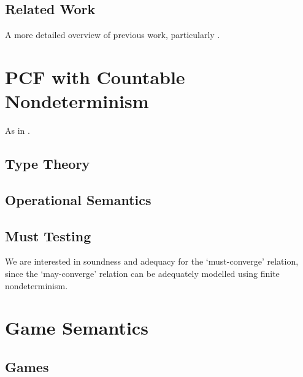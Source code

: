 \documentclass{article}
\begin{document}
\subsection{Related Work}

A more detailed overview of previous work, particularly \cite{LairdOrdinalGames}.

\section{PCF with Countable Nondeterminism}

As in \cite{LairdOrdinalGames}.  

\subsection{Type Theory}

\subsection{Operational Semantics}

\subsection{Must Testing}

We are interested in soundness and adequacy for the `must-converge' relation, since the `may-converge' relation can be adequately modelled using finite nondeterminism.  

\section{Game Semantics}

\subsection{Games}
\end{document}
